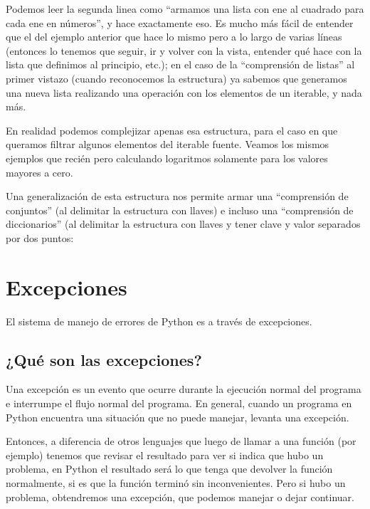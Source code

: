 
Podemos leer la segunda linea como ``armamos una lista con ene al cuadrado para cada ene en números'', y hace exactamente eso. Es mucho más fácil de entender que el  del ejemplo anterior que hace lo mismo pero a lo largo de varias líneas (entonces lo tenemos que seguir, ir y volver con la vista, entender qué hace con la lista que definimos al principio, etc.); en el caso de la ``comprensión de listas'' al primer vistazo (cuando reconocemos la estructura) ya sabemos que generamos una nueva lista realizando una operación con los elementos de un iterable, y nada más.

En realidad podemos complejizar apenas esa estructura, para el caso en que queramos filtrar algunos elementos del iterable fuente. Veamos los mismos ejemplos que recién pero calculando logaritmos solamente para los valores mayores a cero.


Una generalización de esta estructura nos permite armar una ``comprensión de conjuntos'' (al delimitar la estructura con llaves) e incluso una ``comprensión de diccionarios'' (al delimitar la estructura con llaves y tener clave y valor separados por dos puntos:



\section{Excepciones}\label{sec:excepciones}

El sistema de manejo de errores de Python es a través de excepciones. 

\subsection{¿Qué son las excepciones?}

Una excepción es un evento que ocurre durante la ejecución normal del programa e interrumpe el flujo normal del programa. En general, cuando un programa en Python encuentra una situación que no puede manejar, levanta una excepción.

Entonces, a diferencia de otros lenguajes que luego de llamar a una función (por ejemplo) tenemos que revisar el resultado para ver si indica que hubo un problema, en Python el resultado será lo que tenga que devolver la función normalmente, si es que la función terminó sin inconvenientes. Pero si hubo un problema, obtendremos una excepción, que podemos manejar o dejar continuar.

